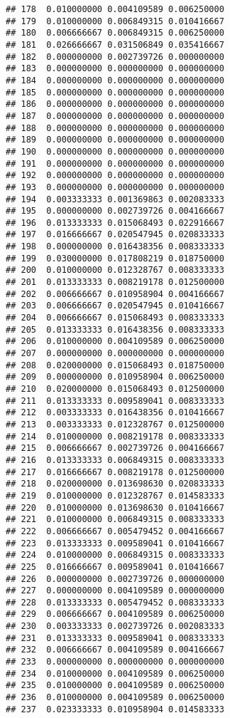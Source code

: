 \documentclass[
]{article}
\begin{document}
\begin{verbatim}
## 178  0.010000000 0.004109589 0.006250000
## 179  0.010000000 0.006849315 0.010416667
## 180  0.006666667 0.006849315 0.006250000
## 181  0.026666667 0.031506849 0.035416667
## 182  0.000000000 0.002739726 0.000000000
## 183  0.000000000 0.000000000 0.000000000
## 184  0.000000000 0.000000000 0.000000000
## 185  0.000000000 0.000000000 0.000000000
## 186  0.000000000 0.000000000 0.000000000
## 187  0.000000000 0.000000000 0.000000000
## 188  0.000000000 0.000000000 0.000000000
## 189  0.000000000 0.000000000 0.000000000
## 190  0.000000000 0.000000000 0.000000000
## 191  0.000000000 0.000000000 0.000000000
## 192  0.000000000 0.000000000 0.000000000
## 193  0.000000000 0.000000000 0.000000000
## 194  0.003333333 0.001369863 0.002083333
## 195  0.000000000 0.002739726 0.004166667
## 196  0.013333333 0.015068493 0.022916667
## 197  0.016666667 0.020547945 0.020833333
## 198  0.000000000 0.016438356 0.008333333
## 199  0.030000000 0.017808219 0.018750000
## 200  0.010000000 0.012328767 0.008333333
## 201  0.013333333 0.008219178 0.012500000
## 202  0.006666667 0.010958904 0.004166667
## 203  0.006666667 0.020547945 0.010416667
## 204  0.006666667 0.015068493 0.008333333
## 205  0.013333333 0.016438356 0.008333333
## 206  0.010000000 0.004109589 0.006250000
## 207  0.000000000 0.000000000 0.000000000
## 208  0.020000000 0.015068493 0.018750000
## 209  0.000000000 0.010958904 0.006250000
## 210  0.020000000 0.015068493 0.012500000
## 211  0.013333333 0.009589041 0.008333333
## 212  0.003333333 0.016438356 0.010416667
## 213  0.003333333 0.012328767 0.012500000
## 214  0.010000000 0.008219178 0.008333333
## 215  0.006666667 0.002739726 0.004166667
## 216  0.013333333 0.006849315 0.008333333
## 217  0.016666667 0.008219178 0.012500000
## 218  0.020000000 0.013698630 0.020833333
## 219  0.010000000 0.012328767 0.014583333
## 220  0.010000000 0.013698630 0.010416667
## 221  0.010000000 0.006849315 0.008333333
## 222  0.006666667 0.005479452 0.004166667
## 223  0.013333333 0.009589041 0.010416667
## 224  0.010000000 0.006849315 0.008333333
## 225  0.016666667 0.009589041 0.010416667
## 226  0.000000000 0.002739726 0.000000000
## 227  0.000000000 0.004109589 0.000000000
## 228  0.013333333 0.005479452 0.008333333
## 229  0.006666667 0.004109589 0.006250000
## 230  0.003333333 0.002739726 0.002083333
## 231  0.013333333 0.009589041 0.008333333
## 232  0.006666667 0.004109589 0.004166667
## 233  0.000000000 0.000000000 0.000000000
## 234  0.010000000 0.004109589 0.006250000
## 235  0.010000000 0.004109589 0.006250000
## 236  0.010000000 0.004109589 0.006250000
## 237  0.023333333 0.010958904 0.014583333

\end{verbatim}
\end{document}
